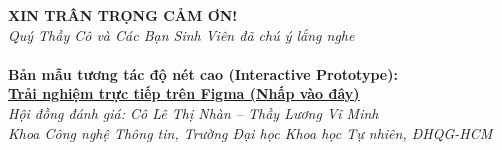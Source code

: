 \begin{frame}[plain]
  \vfill
  \begin{center}
    {\huge \textbf{\color{PetcarePrimary}XIN TRÂN TRỌNG CẢM ƠN!}}\\[3mm]
    {\large \textit{Quý Thầy Cô và Các Bạn Sinh Viên đã chú ý lắng nghe}}\\[6mm]

    \colorbox{PetcarePrimary}{%
    }\\[8mm]

    {\normalsize \textbf{Bản mẫu tương tác độ nét cao (Interactive Prototype):}}\\[3mm]
    {\large \href{https://www.figma.com/design/X92n63gTmwhhI20v7sRqzT/HCI?node-id=0-1&t=5QZaB3diSm5V1LRj-1}{\color{PetcareSecondary}\textbf{\underline{Trải nghiệm trực tiếp trên Figma (Nhấp vào đây)}}}}\\[8mm]

    {\footnotesize \textit{Hội đồng đánh giá: Cô Lê Thị Nhàn -- Thầy Lương Vĩ Minh\\Khoa Công nghệ Thông tin, Trường Đại học Khoa học Tự nhiên, ĐHQG-HCM}}
  \end{center}
  \vfill
\end{frame}
